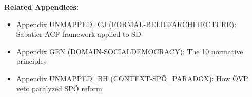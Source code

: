 
\begin{tcolorbox}[colback=orange!5!white, colframe=orange!75!black,
    title=Cross-Reference Links]

\textbf{Related Appendices:}
\begin{itemize}[nosep]
\item Appendix UNMAPPED_CJ (FORMAL-BELIEFARCHITECTURE): Sabatier ACF framework applied to SD
\item Appendix GEN (DOMAIN-SOCIALDEMOCRACY): The 10 normative principles
\item Appendix UNMAPPED_BH (CONTEXT-SPÖ_PARADOX): How ÖVP veto paralyzed SPÖ reform
\end{itemize}

\end{tcolorbox}


